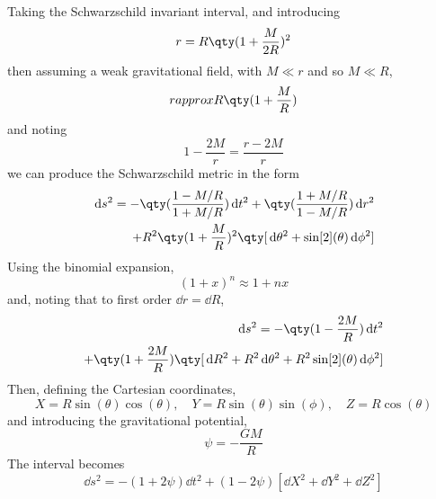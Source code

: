 Taking the Schwarzschild invariant interval, and introducing 
\begin{equation}
  \label{eq:190}
  r = R \qty(1+\frac{M}{2R})^2
\end{equation}
then assuming a weak gravitational field, with $M \ll r$ and so $M \ll R$,
\begin{equation}
  \label{eq:191}
  r approx R \qty(1+ \frac{M}{R})
\end{equation}
and noting \[ 1 - \frac{2M}{r} = \frac{r-2M}{r} \]
we can produce the Schwarzschild metric in the form
\begin{equation}
  \label{eq:192}
\begin{split}
  \dd{s}^2 = - \qty( \frac{1-M/R}{1+M/R} ) \dd{t}^2 + \qty(\frac{1+M/R}{1-M/R}) \dd{r}^2 \\
+R^2 \qty( 1 + \frac{M}{R})^2 \qty[ \dd{\theta}^2 + \sin[2](\theta) \dd{\phi}^2]
\end{split}
\end{equation}
Using the binomial expansion,
\[ (1+x)^n \approx 1+ nx \]
and, noting that to first order $\dd{r} = \dd{R}$,
\begin{equation}
  \label{eq:194}
  \begin{split}
    \dd{s}^2 = - \qty(1 - \frac{2M}{R}) \dd{t}^2 \\
+ \qty(1+\frac{2M}{R}) \qty[ \dd{R}^2 + R^2 \dd{\theta}^2 + R^2 \sin[2](\theta) \dd{\phi}^2]
  \end{split}
\end{equation}
Then, defining the Cartesian coordinates,
\begin{equation}
  \label{eq:195}
  X = R \sin(\theta) \cos(\theta), \quad Y=R \sin(\theta) \sin(\phi), \quad Z = R \cos(\theta)
\end{equation}
and introducing the gravitational potential,
\[ \psi = - \frac{GM}{R} \]
The interval becomes
\begin{equation}
  \label{eq:196}
  \dd{s}^2 = -(1+2\psi) \dd{t}^2 + (1-2\psi) [\dd{X}^2 + \dd{Y}^2 + \dd{Z}^2]
\end{equation}

